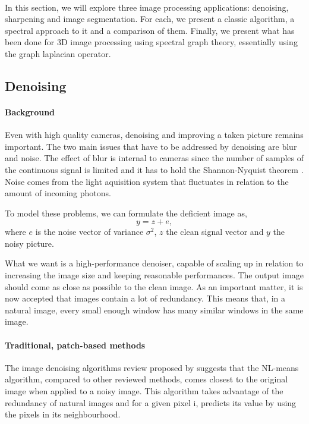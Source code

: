 \paragraph{}

In this section, we will explore three image processing applications: denoising, sharpening and image segmentation.
For each, we present a classic algorithm, a spectral approach to it and a comparison of them.
Finally, we present what has been done for 3D image processing using spectral graph theory, essentially using the graph laplacian operator.

\subsection{Denoising}

\paragraph{Background}

Even with high quality cameras, denoising and improving a taken picture remains important.
The two main issues that have to be addressed by denoising are blur and noise.
The effect of blur is internal to cameras since the number of samples of the continuous signal is limited and it has to hold the Shannon-Nyquist theorem \cite{buades_review_2005}.
Noise comes from the light aquisition system that fluctuates in relation to the amount of incoming photons.

To model these problems, we can formulate the deficient image as,
\[y = z + e,\]
where \(e\) is the noise vector of variance \(\sigma^2\), \(z\) the clean signal vector and \(y\) the noisy picture.

What we want is a high-performance denoiser, capable of scaling up in relation to increasing the image size and keeping reasonable performances.
The output image should come as close as possible to the clean image.
As an important matter, it is now accepted that images contain a lot of redundancy.
This means that, in a natural image, every small enough window has many similar windows in the same image.

\paragraph{Traditional, patch-based methods}

The image denoising algorithms review proposed by \cite{buades_review_2005} suggests that the NL-means algorithm, compared to other reviewed methods, comes closest to the original image when applied to a noisy image.
This algorithm takes advantage of the redundancy of natural images and for a given pixel i, predicts its value by using the pixels in its neighbourhood.

